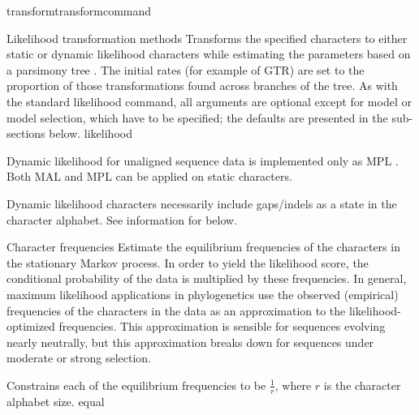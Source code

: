 \begin{command}{transform}{transformcommand}
\begin{arguments}
\begin{argumentgroup}{Likelihood transformation methods}
                {Transforms the specified characters to either static or dynamic
                likelihood characters while estimating the parameters based on a
                parsimony tree \cite{wheeler2013}. The initial rates (for example of 
                GTR) are set to the proportion of those transformations found
                across branches of the tree. As with the standard likelihood command,
                all arguments are optional except for model  or model selection, which 
                have to be specified; the defaults are presented in the sub-sections below.}
                {likelihood}

            \begin{statement}
                Dynamic likelihood for unaligned sequence data is
                implemented only as MPL \cite{barryandhartigan1987}. Both MAL and
                MPL can be applied on static characters.
            \end{statement}

            \begin{statement}
                Dynamic likelihood characters necessarily include gaps/indels as
                a state in the character alphabet. See information for
                 below.
            \end{statement}

        \end{argumentgroup}

        \begin{argumentgroup} {Character frequencies} %
            Estimate the equilibrium frequencies of the characters in the stationary
            Markov process. In order to yield the likelihood score, the 
            conditional probability of the data is multiplied by these frequencies. 
            In general, maximum likelihood applications in phylogenetics use  the observed (empirical)
            frequencies of the characters in the data  as an
            approximation to the likelihood-optimized frequencies. This
            approximation is sensible for sequences evolving nearly
            neutrally, but this approximation breaks down for sequences
            under moderate or strong selection.

                {Constrains each of the equilibrium frequencies to be
                $\frac{1}{r}$, where $r$ is the character alphabet size.}
                {equal}


\end{argumentgroup}
\end{arguments}
\end{command}
